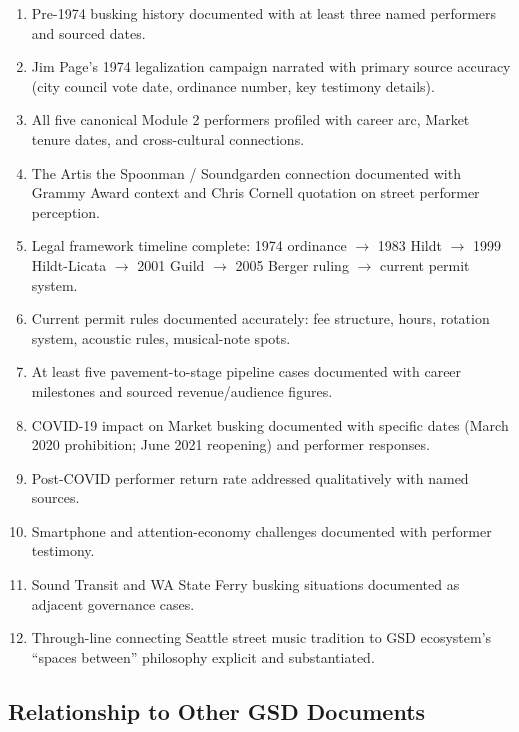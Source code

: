 \documentclass[11pt,letterpaper]{article}
\begin{document}
\begin{enumerate}[leftmargin=1.5em]
  \item Pre-1974 busking history documented with at least three named performers and sourced dates.
  \item Jim Page's 1974 legalization campaign narrated with primary source accuracy (city council vote date, ordinance number, key testimony details).
  \item All five canonical Module 2 performers profiled with career arc, Market tenure dates, and cross-cultural connections.
  \item The Artis the Spoonman / Soundgarden connection documented with Grammy Award context and Chris Cornell quotation on street performer perception.
  \item Legal framework timeline complete: 1974 ordinance $\rightarrow$ 1983 Hildt $\rightarrow$ 1999 Hildt-Licata $\rightarrow$ 2001 Guild $\rightarrow$ 2005 Berger ruling $\rightarrow$ current permit system.
  \item Current permit rules documented accurately: fee structure, hours, rotation system, acoustic rules, musical-note spots.
  \item At least five pavement-to-stage pipeline cases documented with career milestones and sourced revenue/audience figures.
  \item COVID-19 impact on Market busking documented with specific dates (March 2020 prohibition; June 2021 reopening) and performer responses.
  \item Post-COVID performer return rate addressed qualitatively with named sources.
  \item Smartphone and attention-economy challenges documented with performer testimony.
  \item Sound Transit and WA State Ferry busking situations documented as adjacent governance cases.
  \item Through-line connecting Seattle street music tradition to GSD ecosystem's ``spaces between'' philosophy explicit and substantiated.
\end{enumerate}

\subsection{Relationship to Other GSD Documents}
\end{document}
